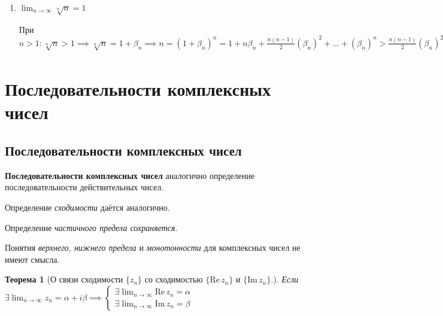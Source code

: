 \documentclass[a4paper,oneside]{article}
\newcommand{\imagin}{\mathrm{Im} \,}
\newcommand{\real}{\mathrm{Re} \,}
\newcommand{\dslim}{\displaystyle\lim}
\newcommand{\dslimn}{\dslim_{n \to \infty}}
\newtheorem{theorem}{Теорема}[subsection]
\theoremstyle{definition}
\theoremstyle{definition}
\theoremstyle{definition}
\begin{document}
\begin{enumerate}
        $0 < \underbrace{\frac{a}{1} * \frac{a}{2} * \frac{a}{3} * \dots * \frac{a}{k_0 - 1}}_A
        * \underbrace{\frac{a}{k_0}}_{\frac{a}{k_0} = q < 1}
        * \frac{a}{k_0 + 1} * \dots *
        \frac{a}{n} < A * q^{n - k_0 + 1}$

        $\implies$ по \textit{$7^{\text{о}}$ свойству сходящихся последовательностей}
        $\dslimn \frac{a^n}{n!} = 0$

    
    \item 
        $\dslimn \sqrt[n]{n} = 1$
        
        При $n > 1: \sqrt[n]{n} > 1 \implies \sqrt[n]{n} = 1 + \beta_n \implies
        n = (1 + \beta_n)^n = 1 + n \beta_n + \frac{n (n - 1)}{2} (\beta_n)^2 + \dots +
        (\beta_n)^n > \frac{n (n - 1)}{2} (\beta_n) ^ 2 \implies
        0 < \beta_n < \sqrt{\frac{2}{n-1}} \implies
        \dslimn \beta_n = 0 \implies
        \dslimn \sqrt[n]{n} = 1$
\end{enumerate}

\section{Последовательности комплексных чисел}

\subsection{Последовательности комплексных чисел}

\textbf{Последовательности комплексных чисел} аналогично определение последовательности
действительных чисел.

Определение \textit{сходимости} даётся аналогично.

Определение \textit{частичного предела сохраняется}.

Понятия \textit{верхнего, нижнего предела} и \textit{монотонности} для комплексных
чисел не имеют смысла.

\begin{theorem}[О связи сходимости $\{z_n\}$ со сходимостью $\{\real z_n\}$ и $\{\imagin z_n\}$.]
    Если $\exists \dslimn z_n = \alpha + i \beta
    \implies \begin{cases}
        \exists \dslimn \real z_n = \alpha \\
        \exists \dslimn \imagin z_n = \beta
    \end{cases}$        
\end{theorem}
\end{document}
